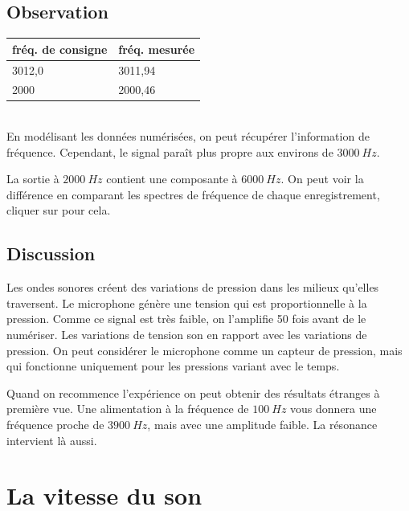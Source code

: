 \documentclass{book}
\begin{document}
\subsection{Observation}


\begin{tabular}{|l|l|}
\hline
\textbf{fréq. de consigne}&\textbf{fréq. mesurée}
\\ \hline
3012,0&3011,94
\\ \hline
2000&2000,46
\\ \hline
\end{tabular}\\[0.5em]



En modélisant les données numérisées, on peut récupérer l'information de fréquence. Cependant, le signal paraît plus propre aux environs de $3000\ Hz$.



La sortie à $2000\ Hz$ contient une composante à $6000\ Hz$. On peut voir la différence en comparant les spectres de fréquence de chaque enregistrement, cliquer sur   pour cela.

\subsection{Discussion}


Les ondes sonores créent des variations de pression dans les milieux qu'elles traversent. Le microphone génère une tension qui est proportionnelle à la pression. Comme ce signal est très faible, on l'amplifie 50 fois avant de le numériser. Les variations de tension son en rapport avec les variations de pression. On peut considérer le microphone comme un capteur de pression, mais qui fonctionne uniquement pour les pressions variant avec le temps.



Quand on recommence l'expérience on peut obtenir des résultats étranges à première vue. Une alimentation à la fréquence de $100\ Hz$ vous donnera une fréquence proche de $3900\ Hz$, mais avec une amplitude faible. La résonance intervient là aussi.







\section{La vitesse du son}
\end{document}
